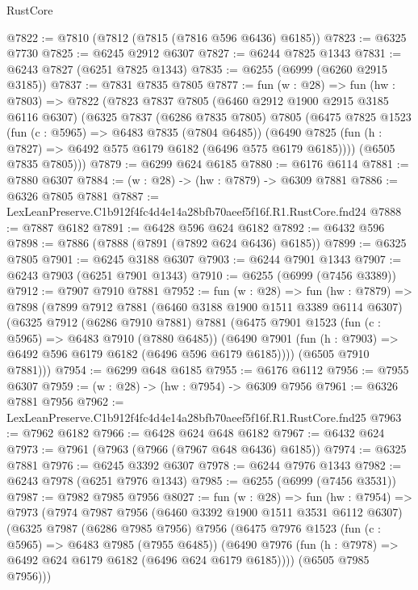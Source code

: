 \begin{lexlean}{RustCore}
\begin{coremodule}
@7822 := @7810 (@7812 (@7815 (@7816 @596 @6436) @6185))
@7823 := @6325 @7730
@7825 := @6245 @2912 @6307
@7827 := @6244 @7825 @1343
@7831 := @6243 @7827 (@6251 @7825 @1343)
@7835 := @6255 (@6999 (@6260 @2915 @3185))
@7837 := @7831 @7835 @7805
@7877 := fun (w : @28) =>
  fun (hw : @7803) =>
  @7822
    (@7823
      @7837
      @7805
      (@6460 @2912 @1900 @2915 @3185 @6116 @6307)
      (@6325
        @7837
        (@6286 @7835 @7805)
        @7805
        (@6475
          @7825
          @1523
          (fun (c : @5965) => @6483 @7835 (@7804 @6485))
          (@6490 @7825 (fun (h : @7827) => @6492 @575 @6179 @6182 (@6496 @575 @6179 @6185))))
        (@6505 @7835 @7805)))
@7879 := @6299 @624 @6185
@7880 := @6176 @6114
@7881 := @7880 @6307
@7884 := (w : @28) -> (hw : @7879) -> @6309 @7881
@7886 := @6326 @7805 @7881
@7887 := LexLeanPreserve.C1b912f4fc4d4e14a28bfb70aeef5f16f.R1.RustCore.fnd24
@7888 := @7887 @6182
@7891 := @6428 @596 @624 @6182
@7892 := @6432 @596
@7898 := @7886 (@7888 (@7891 (@7892 @624 @6436) @6185))
@7899 := @6325 @7805
@7901 := @6245 @3188 @6307
@7903 := @6244 @7901 @1343
@7907 := @6243 @7903 (@6251 @7901 @1343)
@7910 := @6255 (@6999 (@7456 @3389))
@7912 := @7907 @7910 @7881
@7952 := fun (w : @28) =>
  fun (hw : @7879) =>
  @7898
    (@7899
      @7912
      @7881
      (@6460 @3188 @1900 @1511 @3389 @6114 @6307)
      (@6325
        @7912
        (@6286 @7910 @7881)
        @7881
        (@6475
          @7901
          @1523
          (fun (c : @5965) => @6483 @7910 (@7880 @6485))
          (@6490 @7901 (fun (h : @7903) => @6492 @596 @6179 @6182 (@6496 @596 @6179 @6185))))
        (@6505 @7910 @7881)))
@7954 := @6299 @648 @6185
@7955 := @6176 @6112
@7956 := @7955 @6307
@7959 := (w : @28) -> (hw : @7954) -> @6309 @7956
@7961 := @6326 @7881 @7956
@7962 := LexLeanPreserve.C1b912f4fc4d4e14a28bfb70aeef5f16f.R1.RustCore.fnd25
@7963 := @7962 @6182
@7966 := @6428 @624 @648 @6182
@7967 := @6432 @624
@7973 := @7961 (@7963 (@7966 (@7967 @648 @6436) @6185))
@7974 := @6325 @7881
@7976 := @6245 @3392 @6307
@7978 := @6244 @7976 @1343
@7982 := @6243 @7978 (@6251 @7976 @1343)
@7985 := @6255 (@6999 (@7456 @3531))
@7987 := @7982 @7985 @7956
@8027 := fun (w : @28) =>
  fun (hw : @7954) =>
  @7973
    (@7974
      @7987
      @7956
      (@6460 @3392 @1900 @1511 @3531 @6112 @6307)
      (@6325
        @7987
        (@6286 @7985 @7956)
        @7956
        (@6475
          @7976
          @1523
          (fun (c : @5965) => @6483 @7985 (@7955 @6485))
          (@6490 @7976 (fun (h : @7978) => @6492 @624 @6179 @6182 (@6496 @624 @6179 @6185))))
        (@6505 @7985 @7956)))

\end{coremodule}
\end{lexlean}
